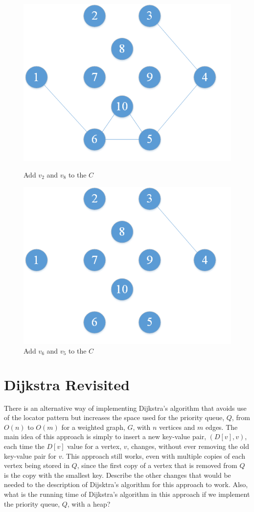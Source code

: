 \documentclass[11pt]{article}
\begin{document}
\begin{figure}[H]
\begin{minipage}[t]{0.50\linewidth}
		\label{fig:subfig2:b}
	\end{minipage}
	\\
		\begin{minipage}[t]{0.50\linewidth}
		\centering
		\includegraphics[width=0.75\linewidth]{Figure/1b3.png}
		\caption{Add $v_2$ and $v_8$ to the $C$}
		\label{fig:subfig2:c}
	\end{minipage}
	\begin{minipage}[t]{0.50\linewidth}
		\centering
		\includegraphics[width=0.75\linewidth]{Figure/1b4.png}
		\caption{Add $v_6$ and $v_5$ to the $C$}
		\label{fig:subfig2:d}
	\end{minipage}
\end{figure}
\section{Dijkstra Revisited}
There is an alternative way of implementing Dijkstra’s algorithm that avoids use of the locator pattern but increases the space used for the priority queue, $Q$, from $O(n)$ to $O(m)$ for a weighted graph, $G$, with $n$ vertices and $m$ edges. The main idea of this approach is simply to insert a new key-value pair, $(D[v], v)$, each time the $D[v]$ value for a vertex, $v$, changes, without ever removing the old key-value pair for $v$. This approach still works, even with multiple copies of each vertex being stored in $Q$, since the first copy of a vertex that is removed from $Q$ is the copy with the smallest key. Describe the other changes that would be needed to the description of Dijsktra’s algorithm for this approach to work. Also, what is the running time of Dijkstra’s algorithm in this approach if we implement the priority queue, $Q$, with a heap?
\end{document}
